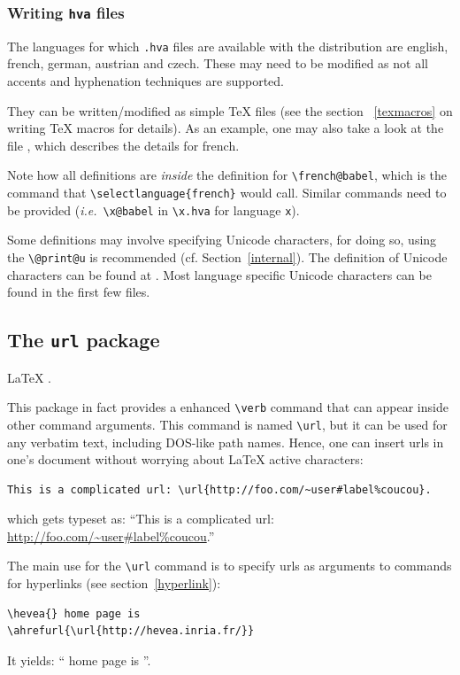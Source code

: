 \subsubsection{Writing \texttt{hva} files}

The languages for which {\tt .hva} files are available with the
distribution are english, french, german, austrian and czech. These
may need to be modified as not all accents and hyphenation techniques
are supported.

They can be written/modified as simple \TeX{} files (see the section ~\ref{texmacros} on writing \TeX{} macros for details). As an example, one may also take a look at the file , which describes the details for french. 

Note how all definitions are \emph{inside} the definition for
\verb+\french@babel+, which is the command that
\verb+\selectlanguage{french}+ would call. Similar commands need to be
provided (\emph{i.e.}\ \verb+\x@babel+ in \verb+\x.hva+ for language
\verb+x+).

Some definitions may involve specifying Unicode characters, for doing
so, using the \verb+\@print@u+ is recommended (cf. Section~\ref{internal}).
The definition of Unicode characters can be found at
.
Most language specific Unicode characters can be found in the first
few files.

\subsection{The \label{urlpackage}\texttt{url} package}
%
\LaTeX{} .

This package in fact provides a enhanced  \verb+\verb+ command that
can appear inside other command arguments.
This command is named \verb+\url+,
but it can be used for any verbatim text, including DOS-like path
names.
Hence, one can insert urls in one's document without worrying about
\LaTeX{} active characters:
\begin{verbatim}
This is a complicated url: \url{http://foo.com/~user#label%coucou}.
\end{verbatim}
which gets typeset as: ``This is a complicated url: \url{http://foo.com/~user#label%coucou}.''

The main use for the \verb+\url+ command is to specify urls as arguments to
\hevea{} commands for hyperlinks (see section~\ref{hyperlink}):
\begin{verbatim}
\hevea{} home page is
\ahrefurl{\url{http://hevea.inria.fr/}}
\end{verbatim}
It yields: ``\hevea{} home page is
''.

